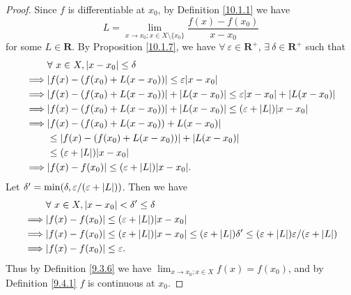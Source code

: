 \begin{proof}
    Since \(f\) is differentiable at \(x_0\), by Definition \ref{10.1.1} we have
    \[
        L = \lim_{x \to x_0 ; x \in X \setminus \{x_0\}} \frac{f(x) - f(x_0)}{x - x_0}
    \]
    for some \(L \in \mathbf{R}\).
    By Proposition \ref{10.1.7}, we have \(\forall\ \varepsilon \in \mathbf{R}^+\), \(\exists\ \delta \in \mathbf{R}^+\) such that
    \begin{align*}
                 & \forall\ x \in X, \abs*{x - x_0} \leq \delta                                                                \\
        \implies & \abs*{f(x) - (f(x_0) + L(x - x_0))} \leq \varepsilon \abs*{x - x_0}                                         \\
        \implies & \abs*{f(x) - (f(x_0) + L(x - x_0))} + \abs*{L(x - x_0)} \leq \varepsilon \abs*{x - x_0} + \abs*{L(x - x_0)} \\
        \implies & \abs*{f(x) - (f(x_0) + L(x - x_0))} + \abs*{L(x - x_0)} \leq (\varepsilon + \abs*{L}) \abs*{x - x_0}        \\
        \implies & \abs*{f(x) - (f(x_0) + L(x - x_0)) + L(x - x_0)}                                                            \\
                 & \leq \abs*{f(x) - (f(x_0) + L(x - x_0))} + \abs*{L(x - x_0)}                                                \\
                 & \leq (\varepsilon + \abs*{L}) \abs*{x - x_0}                                                                \\
        \implies & \abs*{f(x) - f(x_0)} \leq (\varepsilon + \abs*{L}) \abs*{x - x_0}.
    \end{align*}
    Let \(\delta' = \min(\delta, \varepsilon / (\varepsilon + \abs*{L}))\).
    Then we have
    \begin{align*}
                 & \forall\ x \in X, \abs*{x - x_0} < \delta' \leq \delta                                                                                                                       \\
        \implies & \abs*{f(x) - f(x_0)} \leq (\varepsilon + \abs*{L}) \abs*{x - x_0}                                                                                                            \\
        \implies & \abs*{f(x) - f(x_0)} \leq (\varepsilon + \abs*{L}) \abs*{x - x_0} \leq (\varepsilon + \abs*{L}) \delta' \leq (\varepsilon + \abs*{L}) \varepsilon / (\varepsilon + \abs*{L}) \\
        \implies & \abs*{f(x) - f(x_0)} \leq \varepsilon.
    \end{align*}
    Thus by Definition \ref{9.3.6} we have \(\lim_{x \to x_0 ; x \in X} f(x) = f(x_0)\), and by Definition \ref{9.4.1} \(f\) is continuous at \(x_0\).
\end{proof}


